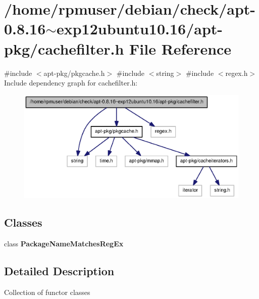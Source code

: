 \section{/home/rpmuser/debian/check/apt-\/0.8.16$\sim$exp12ubuntu10.16/apt-\/pkg/cachefilter.h \-File \-Reference}
\label{cachefilter_8h}
{\ttfamily \#include $<$apt-\/pkg/pkgcache.\-h$>$}\*
{\ttfamily \#include $<$string$>$}\*
{\ttfamily \#include $<$regex.\-h$>$}\*
\-Include dependency graph for cachefilter.\-h\-:
\nopagebreak
\begin{figure}[H]
\begin{center}
\leavevmode
\includegraphics[width=350pt]{cachefilter_8h__incl}
\end{center}
\end{figure}
\subsection*{\-Classes}
\begin{DoxyCompactItemize}
\item 
class {\bf \-Package\-Name\-Matches\-Reg\-Ex}
\end{DoxyCompactItemize}


\subsection{\-Detailed \-Description}
\-Collection of functor classes 